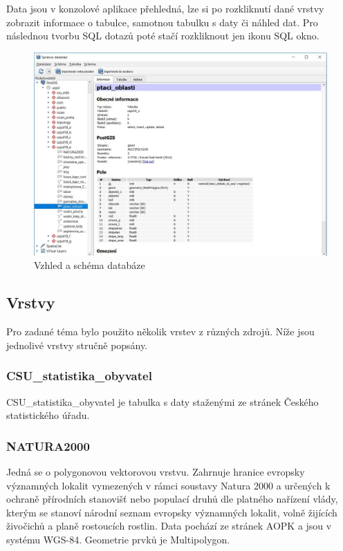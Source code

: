 \documentclass[a4paper, 12pt]{article}
\begin{document}
Data jsou v konzolové aplikace přehledná, lze si po rozkliknutí dané vrstvy zobrazit informace o tabulce, samotnou tabulku s daty či náhled dat. Pro následnou tvorbu SQL dotazů poté stačí rozkliknout jen ikonu SQL okno.

\begin{figure}[h!]
	\centering
	\includegraphics[width=15cm]{pictures/vzhled.jpg}
	\caption{Vzhled a schéma databáze}
\end{figure}

\subsection{Vrstvy}
Pro zadané téma bylo použito několik vrstev z různých zdrojů. Níže jsou jednolivé vrstvy stručně popsány.

\subsubsection{CSU\_statistika\_obyvatel}
CSU\_statistika\_obyvatel je tabulka s daty staženými ze stránek Českého statistického úřadu. 

\subsubsection{NATURA2000}
Jedná se o polygonovou vektorovou vrstvu. Zahrnuje hranice evropsky významných lokalit vymezených v rámci soustavy Natura 2000 a určených k ochraně přírodních stanovišť nebo populací druhů dle platného nařízení vlády, kterým se stanoví národní seznam evropsky významných lokalit, volně žijících živočichů a planě rostoucích rostlin. Data pochází ze stránek AOPK a jsou v systému WGS-84. Geometrie prvků je Multipolygon.
\end{document}
